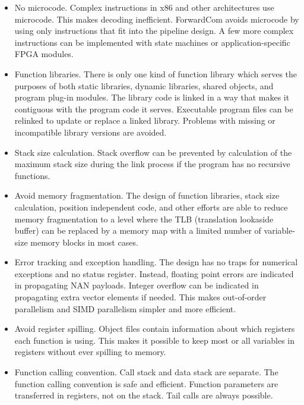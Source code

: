 \documentclass[forwardcom.tex]{subfiles}
\begin{document}
\begin{itemize}
\item No microcode. Complex instructions in x86 and other architectures use microcode. This makes decoding inefficient. ForwardCom avoids microcode by using only instructions that fit into the pipeline design. A few more complex instructions can be implemented with state machines or application-specific FPGA modules.

\item Function libraries. There is only one kind of function library which serves the purposes of both static libraries, dynamic libraries, shared objects, and program plug-in modules. The library code is linked in a way that makes it contiguous with the program code it serves. Executable program files can be relinked to update or replace a linked library. Problems with missing or incompatible library versions are avoided.

\item Stack size calculation. Stack overflow can be prevented by calculation of the maximum stack size during the link process if the program has no recursive functions.

\item Avoid memory fragmentation. The design of function libraries, stack size calculation, position independent code, and other efforts are able to reduce memory fragmentation to a level where the TLB (translation lookaside buffer) can be replaced by a memory map with a limited number of variable-size memory blocks in most cases.

\item Error tracking and exception handling. The design has no traps for numerical exceptions and no status register. Instead, floating point errors are indicated in propagating NAN payloads. Integer overflow can be indicated in propagating extra vector elements if needed. This makes out-of-order parallelism and SIMD parallelism simpler and more efficient.

\item Avoid register spilling. Object files contain information about which registers each function is using. This makes it possible to keep most or all variables in registers without ever spilling to memory.

\item Function calling convention. Call stack and data stack are separate. The function calling convention is safe and efficient. Function parameters are transferred in registers, not on the stack. Tail calls are always possible.


\end{itemize}
\end{document}
